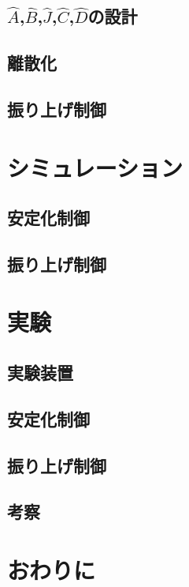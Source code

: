 \documentclass[a4j,11pt,twoside]{jbook}
\begin{document}
\section{$\hat{A}$,$\hat{B}$,$\hat{J}$,$\hat{C}$,$\hat{D}$の設計}
\section{離散化}
\section{振り上げ制御}	

\chapter{シミュレーション}
\section{安定化制御}
\section{振り上げ制御}

\chapter{実験}
\section{実験装置}
\section{安定化制御}
\section{振り上げ制御}
\section{考察}

\chapter{おわりに}
\end{document}

